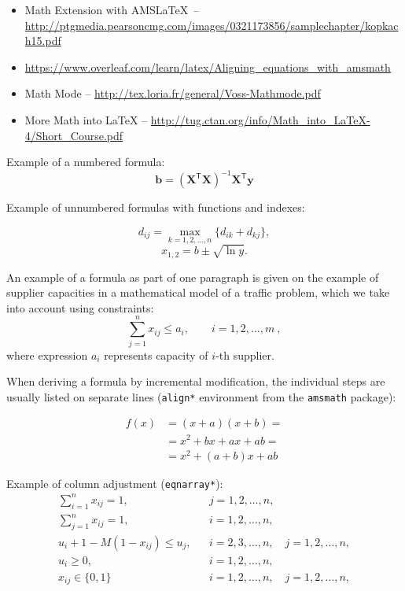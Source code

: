 \begin{itemize}
\item Math Extension with AMS\LaTeX\ -- \url{http://ptgmedia.pearsoncmg.com/images/0321173856/samplechapter/kopkach15.pdf}
\item \url{https://www.overleaf.com/learn/latex/Aligning_equations_with_amsmath}
\item Math Mode -- \url{http://tex.loria.fr/general/Voss-Mathmode.pdf}
\item More Math into LaTeX -- \url{http://tug.ctan.org/info/Math_into_LaTeX-4/Short_Course.pdf}
\end{itemize}

Example of a numbered formula:
\begin{equation}
\mathbf{b}=(\mathbf{X}^\mathsf{T}\mathbf{X})^{-1}\mathbf{X}^\mathsf{T}\mathbf{y}
\end{equation}

Example of unnumbered formulas with functions and indexes:

$$
d_{ij}=\max_{k=1,2,\dots,n} \{d_{ik}+d_{kj}\},
$$
$$
x_{1,2}=b \pm \sqrt{\ln y}.
$$

An example of a formula as part of one paragraph is given on the example of 
supplier capacities in a mathematical model of a traffic problem, which we take 
into account using constraints:
\begin{equation}
\sum_{j=1}^n x_{ij} \le a_i, \qquad i=1,2,\dots,m\ ,
\end{equation}
\noindent
where expression $a_i$ represents capacity of $i$-th supplier.

When deriving a formula by incremental modification, the individual steps are 
usually listed on separate lines (\verb'align*' environment from the \verb|amsmath| package):

\begin{align*}
 f(x) &= (x+a)(x+b) =\\
      &= x^2 + bx + ax + ab =\\
      &= x^2 + (a+b)x + ab
\end{align*}

Example of column adjustment (\verb|eqnarray*|):
\begin{eqnarray*}
\sum_{i=1}^n x_{ij} =1, && j=1,2,\dots,n,\\
\sum_{j=1}^n x_{ij} =1, && i=1,2,\dots,n,\\
u_i + 1 - M(1 - x_{ij}) \le u_j, && i=2,3,\dots,n,\quad j=1,2,\dots,n,\\
u_i \ge 0,              && i=1,2,\dots,n,\\
x_{ij} \in \{0,1\} && i=1,2,\dots,n,\quad j=1,2,\dots,n,\\
\end{eqnarray*}